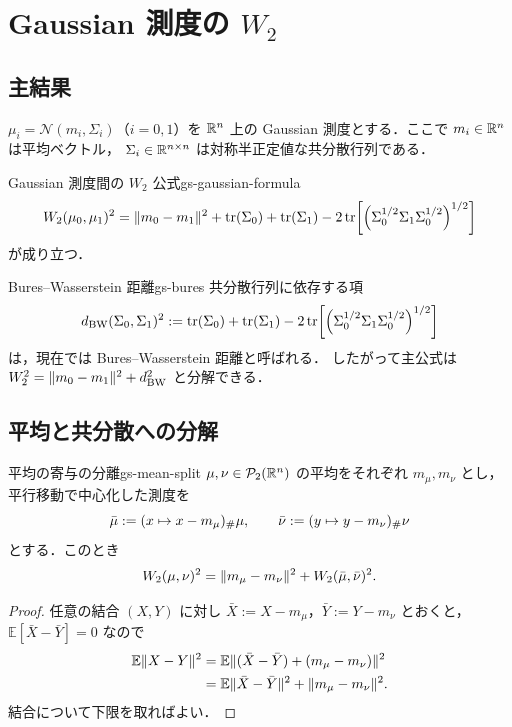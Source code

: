 \chapter{Gaussian 測度の \texorpdfstring{$W_2$}{W2}}
\label{ch:gaussian-measures}

\section{主結果}
\label{sec:gaussian-main-result}

$\mu_i=\mathcal{N}(m_i,\Sigma_i)$（$i=0,1$）を
$\mathbb{R}^n$ 上の Gaussian 測度とする．ここで
$m_i\in\mathbb{R}^n$ は平均ベクトル，
$\Sigma_i\in\mathbb{R}^{n\times n}$ は対称半正定値な共分散行列である．

\begin{theorem}{Gaussian 測度間の $W_2$ 公式}{gs-gaussian-formula}
  \[
    W_2(\mu_0,\mu_1)^2
    =
    \lVert m_0-m_1 \rVert^2
    +\operatorname{tr}(\Sigma_0)+\operatorname{tr}(\Sigma_1)
    -2\operatorname{tr}\!\left[
      \left(
        \Sigma_0^{1/2}\Sigma_1\Sigma_0^{1/2}
      \right)^{1/2}
    \right]
  \]
  が成り立つ．
\end{theorem}

\begin{remark}{Bures–Wasserstein 距離}{gs-bures}
  共分散行列に依存する項
  \[
    d_{\mathrm{BW}}(\Sigma_0,\Sigma_1)^2
    :=
    \operatorname{tr}(\Sigma_0)+\operatorname{tr}(\Sigma_1)
    -2\operatorname{tr}\!\left[
      \left(
        \Sigma_0^{1/2}\Sigma_1\Sigma_0^{1/2}
      \right)^{1/2}
    \right]
  \]
  は，現在では Bures–Wasserstein 距離と呼ばれる．
  したがって主公式は
  $W_2^2=\lVert m_0-m_1 \rVert^2+d_{\mathrm{BW}}^2$ と分解できる．
\end{remark}

\section{平均と共分散への分解}
\label{sec:mean-covariance-split}

\begin{lemma}{平均の寄与の分離}{gs-mean-split}
  $\mu,\nu\in\mathcal{P}_{2}(\mathbb{R}^n)$ の平均をそれぞれ $m_\mu,m_\nu$ とし，
  平行移動で中心化した測度を
  \[
    \bar{\mu}:=(x\mapsto x-m_\mu)_\#\mu,
    \qquad
    \bar{\nu}:=(y\mapsto y-m_\nu)_\#\nu
  \]
  とする．このとき
  \[
    W_2(\mu,\nu)^2
    =
    \lVert m_\mu-m_\nu \rVert^2
    +
    W_2(\bar{\mu},\bar{\nu})^2.
  \]
\end{lemma}

\begin{proof}
  任意の結合 $(X,Y)$ に対し
  $\bar X:=X-m_\mu$，$\bar Y:=Y-m_\nu$ とおくと，
  $\mathbb{E}[\bar X-\bar Y]=0$ なので
  \[
    \begin{aligned}
      \mathbb{E}\lVert X-Y \rVert^2
      &=
      \mathbb{E}\lVert 
        (\bar X-\bar Y)+(m_\mu-m_\nu)
       \rVert^2 \\
      &=
      \mathbb{E}\lVert \bar X-\bar Y \rVert^2
      +\lVert m_\mu-m_\nu \rVert^2.
    \end{aligned}
  \]
  結合について下限を取ればよい．
\end{proof}

